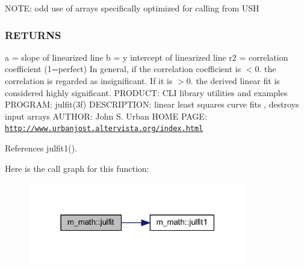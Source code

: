 N\+O\+TE\+: odd use of arrays specifically optimized for calling from U\+SH

\subsubsection*{R\+E\+T\+U\+R\+NS}

a = slope of linearized line b = y intercept of linearized line r2 = correlation coefficient (1=perfect) In general, if the correlation coefficient is $<$0. the correlation is regarded as insignificant. If it is $>$0. the derived linear fit is considered highly significant. P\+R\+O\+D\+U\+CT\+: C\+LI library utilities and examples P\+R\+O\+G\+R\+AM\+: julfit(3f) D\+E\+S\+C\+R\+I\+P\+T\+I\+ON\+: linear least squares curve fits , destroys input arrays A\+U\+T\+H\+OR\+: John S. Urban H\+O\+ME P\+A\+GE\+: \href{http://www.urbanjost.altervista.org/index.html}{\tt http\+://www.\+urbanjost.\+altervista.\+org/index.\+html} 

References julfit1().

Here is the call graph for this function\+:
\nopagebreak
\begin{figure}[H]
\begin{center}
\leavevmode
\includegraphics[width=271pt]{namespacem__math_ae78c38ba0be037a58cace0da51c7a8ca_cgraph}
\end{center}
\end{figure}
\mbox{\label{namespacem__math_a9a1a7478c87dda7eb126127970f70b7b}} 
